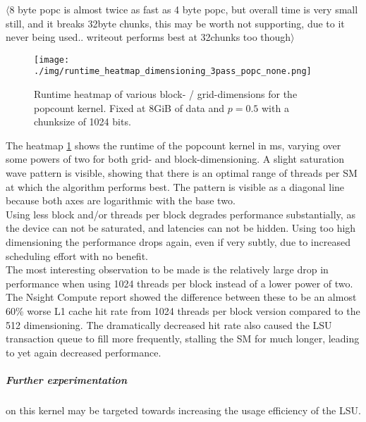 \documentclass{tudscrreprt}
\newcommand{\markr}[1]{\textcolor{review}{$\langle$#1$\rangle$}}
\begin{document}
			\markr{8 byte popc is almost twice as fast as 4 byte popc, but overall time is very small still, and it breaks 32byte chunks, this may be worth not supporting, due to it never being used.. writeout performs best at 32chunks too though}\\
			
			\begin{figure}[!ht]
				\centering
				\texttt{[image: ./img/runtime\_heatmap\_dimensioning\_3pass\_popc\_none.png]}
				\caption{\label{fig:runtime_heatmap_dimensioning_3pass_popc_none}Runtime heatmap of various block- / grid-dimensions for the popcount kernel. Fixed at 8GiB of data and $p=0.5$ with a chunksize of 1024 bits.}
			\end{figure}
			
			The heatmap \ref{fig:runtime_heatmap_dimensioning_3pass_popc_none} shows the runtime of the popcount kernel in ms, varying over some powers of two for both grid- and block-dimensioning. A slight saturation wave pattern is visible, showing that there is an optimal range of threads per SM at which the algorithm performs best. The pattern is visible as a diagonal line because both axes are logarithmic with the base two. \\
			Using less block and/or threads per block degrades performance substantially, as the device can not be saturated, and latencies can not be hidden. Using too high dimensioning the performance drops again, even if very subtly, due to increased scheduling effort with no benefit. \\
			The most interesting observation to be made is the relatively large drop in performance when using 1024 threads per block instead of a lower power of two. The Nsight Compute report showed the difference between these to be an almost 60\% worse L1 cache hit rate from 1024 threads per block version compared to the 512 dimensioning. The dramatically decreased hit rate also caused the LSU transaction queue to fill more frequently, stalling the SM for much longer, leading to yet again decreased performance. \\
			
			\subparagraph{Further experimentation} on this kernel may be targeted towards increasing the usage efficiency of the LSU. \\
			
\end{document}
